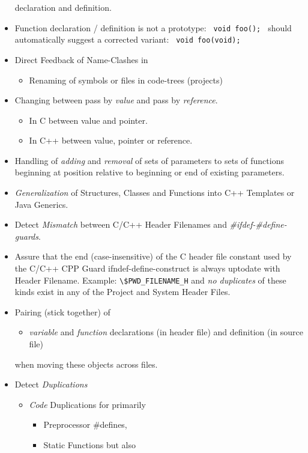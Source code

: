 \documentclass[a4paper,10pt,twocolumn]{article}
\newcommand{\codeC}[1]{\lstset{language=C}\lstinline!#1!}
\begin{document}
\begin{itemize}
  declaration and definition.
\item Function declaration / definition is not a prototype: {\centering \texttt{
      void foo(); } } should automatically suggest a corrected variant:
  {\centering \texttt{ void foo(void); } }
\item Direct Feedback of Name-Clashes in
  \begin{itemize}
  \item Renaming of symbols or files in code-trees (projects)
  \end{itemize}
\item Changing between pass by \emph{value} and pass by \emph{reference}.
  \begin{itemize}
  \item In C between value and pointer.
  \item In C++ between value, pointer or reference.
  \end{itemize}
\item Handling of \emph{adding} and \emph{removal} of sets of parameters to sets
  of functions beginning at position relative to beginning or end of existing
  parameters.
\item \emph{Generalization} of Structures, Classes and Functions into C++
  Templates or Java Generics.
\item Detect \emph{Mismatch} between C/C++ Header Filenames and
  \emph{\#ifdef-\#define-guards}.
\item Assure that the end (case-insensitive) of the C header file constant used
  by the C/C++ CPP Guard ifndef-define-construct is always uptodate with Header
  Filename. Example: \codeC{\$PWD_FILENAME_H} and \emph{no duplicates} of these
  kinds exist in any of the Project and System Header Files.
\item Pairing (stick together) of
  \begin{itemize}
  \item \emph{variable} and \emph{function} declarations (in header file) and
    definition (in source file)
  \end{itemize} when moving these objects across files.
\item Detect \emph{Duplications}
  \begin{itemize}
  \item \emph{Code} Duplications for primarily
    \begin{itemize}
    \item Preprocessor \#defines,
    \item Static Functions but also

\end{itemize}
\end{itemize}
\end{itemize}
\end{document}
